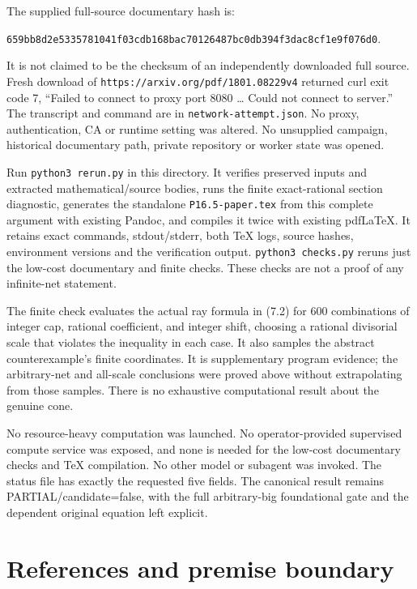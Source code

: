 \documentclass[10pt]{article}
\begin{document}
The supplied full-source documentary hash is:

\texttt{659bb8d2e5335781041f03cdb168bac70126487bc0db394f3dac8cf1e9f076d0}.

It is not claimed to be the checksum of an independently downloaded full
source. Fresh download of \texttt{https://arxiv.org/pdf/1801.08229v4}
returned curl exit code 7, ``Failed to connect to proxy port 8080
\ldots{} Could not connect to server.'' The transcript and command are
in \texttt{network-attempt.json}. No proxy, authentication, CA or
runtime setting was altered. No unsupplied campaign, historical
documentary path, private repository or worker state was opened.

Run \texttt{python3\ rerun.py} in this directory. It verifies preserved
inputs and extracted mathematical/source bodies, runs the finite
exact-rational section diagnostic, generates the standalone
\texttt{P16.5-paper.tex} from this complete argument with existing
Pandoc, and compiles it twice with existing pdfLaTeX. It retains exact
commands, stdout/stderr, both TeX logs, source hashes, environment
versions and the verification output. \texttt{python3\ checks.py} reruns
just the low-cost documentary and finite checks. These checks are not a
proof of any infinite-net statement.

The finite check evaluates the actual ray formula in (7.2) for 600
combinations of integer cap, rational coefficient, and integer shift,
choosing a rational divisorial scale that violates the inequality in
each case. It also samples the abstract counterexample's finite
coordinates. It is supplementary program evidence; the arbitrary-net and
all-scale conclusions were proved above without extrapolating from those
samples. There is no exhaustive computational result about the genuine
cone.

No resource-heavy computation was launched. No operator-provided
supervised compute service was exposed, and none is needed for the
low-cost documentary checks and TeX compilation. No other model or
subagent was invoked. The status file has exactly the requested five
fields. The canonical result remains PARTIAL/candidate=false, with the
full arbitrary-big foundational gate and the dependent original equation
left explicit.

\section{References and premise
boundary}\label{references-and-premise-boundary}
\end{document}
